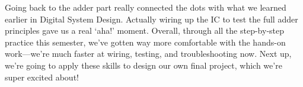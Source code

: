 Going back to the adder part really connected the dots with what we learned earlier in Digital System Design. Actually wiring up the IC to test the full adder principles gave us a real `aha!' moment. Overall, through all the step-by-step practice this semester, we've gotten way more comfortable with the hands-on work—we're much faster at wiring, testing, and troubleshooting now. Next up, we're going to apply these skills to design our own final project, which we're super excited about!